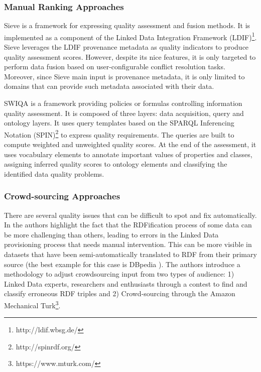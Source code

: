 \documentclass[onecolumn, crcready]{iosart2c}
\begin{document}
\subsubsection{Manual Ranking Approaches}

Sieve \cite{Mendes2012} is a framework for expressing quality assessment and fusion methods. It is implemented as a component of the Linked Data Integration Framework (LDIF)\footnote{http://ldif.wbsg.de/}. Sieve leverages the LDIF provenance metadata as quality indicators to produce quality assessment scores. However, despite its nice features, it is only targeted to perform data fusion based on user-configurable conflict resolution tasks. Moreover, since Sieve main input is provenance metadata, it is only limited to domains that can provide such metadata associated with their data.

SWIQA \cite{Furber2011a} is a framework providing policies or formulas controlling information quality assessment. It is composed of three layers: data acquisition, query and ontology layers. It uses query templates based on the SPARQL Inferencing Notation (SPIN)\footnote{http://spinrdf.org/} to express quality requirements. The queries are built to compute weighted and unweighted quality scores. At the end of the assessment, it uses vocabulary elements to annotate important values of properties and classes, assigning inferred quality scores to ontology elements and classifying the identified data quality problems.

\subsubsection{Crowd-sourcing Approaches}

There are several quality issues that can be difficult to spot and fix automatically. In \cite{Acosta2013} the authors highlight the fact that the RDFification process of some data can be more challenging than others, leading to errors in the Linked Data provisioning process that needs manual intervention. This can be more visible in datasets that have been semi-automatically translated to RDF from their primary source (the best example for this case is DBpedia \cite{bizer_dbpedia_2009}). The authors introduce a methodology to adjust crowdsourcing input from two types of audience: 1) Linked Data experts, researchers and enthusiasts through a contest to find and classify erroneous RDF triples and 2) Crowd-sourcing through the Amazon Mechanical Turk\footnote{https://www.mturk.com/}.
\end{document}
